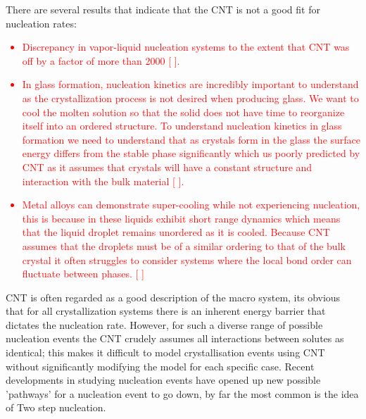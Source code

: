 \documentclass[a4paper,oneside,11pt]{book}
\begin{document}
There are several results that indicate that the CNT is not a good fit for nucleation rates:
\textcolor{red}{
	\begin{itemize}
		\item Discrepancy in vapor-liquid nucleation systems to the extent that CNT was off by a factor of more than 2000 [ ]. 
		\item In glass formation, nucleation kinetics are incredibly important to understand as the crystallization process is not desired when producing glass. We want to cool the molten solution so that the solid does not have time to reorganize itself into an ordered structure. To understand nucleation kinetics in glass formation we need to understand that as crystals form in the glass the surface energy differs from the stable phase significantly which us poorly predicted by CNT as it assumes that crystals will have a constant structure and interaction with the bulk material [ ]. 
		\item Metal alloys can demonstrate super-cooling while not experiencing nucleation, this is because in these liquids exhibit short range dynamics which means that the liquid droplet remains unordered as it is cooled. Because CNT assumes that the droplets must be of a similar ordering to that of the bulk crystal it often struggles to consider systems where the local bond order can fluctuate between phases. [ ]
	\end{itemize}
}

CNT is often regarded as a good description of the macro system, its obvious that for all crystallization systems there is an inherent energy barrier that dictates the nucleation rate. However, for such a diverse range of possible nucleation events the CNT crudely assumes all interactions between solutes as identical; this makes it difficult to model crystallisation events using CNT without significantly modifying the model for each specific case. Recent developments in studying nucleation events have opened up new possible 'pathways' for a nucleation event to go down, by far the most common is the idea of Two step nucleation.
\end{document}

